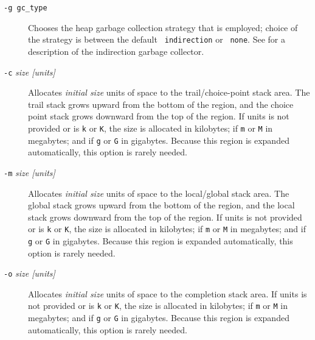 \begin{description}
\item[{\tt -g gc\_type}] Chooses the heap garbage collection strategy
  that is employed; choice of the strategy is between the default {\tt
    indirection}  or {\tt
    none}. See \cite{CaSC01} for a description of the indirection
  garbage collector.

%
\item[{\tt -c} {\em size [units]}] Allocates {\em initial size\/}
  units of space to the trail/choice-point stack area.  The trail
  stack grows upward from the bottom of the region, and the choice
  point stack grows downward from the top of the region.  If units is
  not provided or is {\tt k} or {\tt K}, the size is allocated in
  kilobytes; if {\tt m} or {\tt M} in megabytes; and if {\tt g} or
  {\tt G} in gigabytes.  Because this region is expanded
  automatically, this option is rarely needed.
%
\item[{\tt -m} {\em size [units]}] Allocates {\em initial size\/}
  units of space to the local/global stack area.  The global stack
  grows upward from the bottom of the region, and the local stack
  grows downward from the top of the region.  If units is not provided
  or is {\tt k} or {\tt K}, the size is allocated in kilobytes; if
  {\tt m} or {\tt M} in megabytes; and if {\tt g} or {\tt G} in
  gigabytes.  Because this region is expanded automatically, this
  option is rarely needed.
%
\item[{\tt -o} {\em size [units]}] Allocates {\em initial size\/}
  units of space to the completion stack area.  If units is not
  provided or is {\tt k} or {\tt K}, the size is allocated in
  kilobytes; if {\tt m} or {\tt M} in megabytes; and if {\tt g} or
  {\tt G} in gigabytes.  Because this region is expanded
  automatically, this option is rarely needed.


\end{description}
